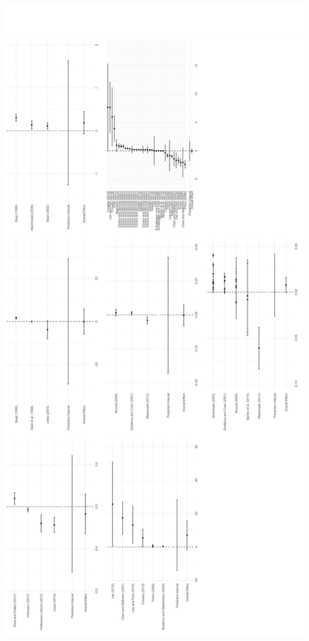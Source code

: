\documentclass[
]{article}
\begin{document}
\includegraphics{appendixV5_files/figure-latex/unnamed-chunk-46-2.pdf}
\includegraphics[width=49.21in]{appendixV5_files/figure-latex/unnamed-chunk-46-1}
\end{document}
